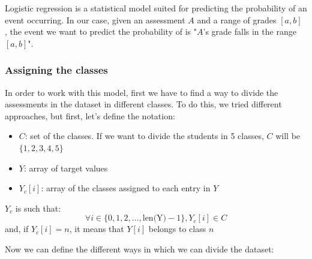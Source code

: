 \documentclass{article}
\begin{document}
Logistic regression is a statistical model suited for predicting the probability of an event occurring. In our case, given an assessment $A$ and a range of grades $[a,b]$ , the event we want to predict the probability of is "$A$'s grade falls in the range $[a,b]$". 

\subsubsection{Assigning the classes}

In order to work with this model, first we have to find a way to divide the assessments in the dataset in different classes. To do this, we tried different approaches, but first, let's define the notation:
\begin{itemize}
\item[] $C$: set of the classes. If we want to divide the students in 5 classes, $C$ will be $\{1,2,3,4,5\}$

\item[] $Y$: array of target values

\item[] $Y_c[i]$: array of the classes assigned to each entry in $Y$

\end{itemize}

$Y_c$ is such that:
$$
\forall i \in \{0, 1, 2, \ldots, \text{{len(Y)}}-1\}, Y_c[i] \in C
$$
and, if $Y_c[i] = n$, it means that $Y[i]$ belongs to class $n$

Now we can define the different ways in which we can divide the dataset:
\end{document}
